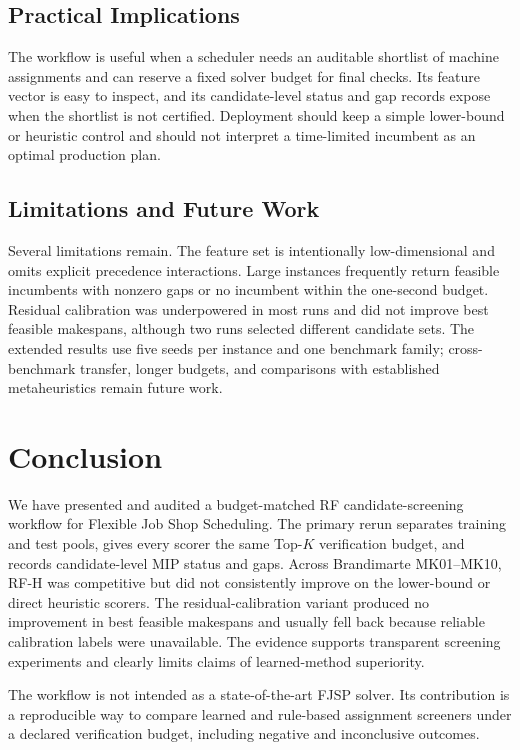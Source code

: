 \documentclass[12pt]{article}
\begin{document}
\subsection{Practical Implications}
The workflow is useful when a scheduler needs an auditable shortlist of machine assignments and can reserve a fixed solver budget for final checks. Its feature vector is easy to inspect, and its candidate-level status and gap records expose when the shortlist is not certified. Deployment should keep a simple lower-bound or heuristic control and should not interpret a time-limited incumbent as an optimal production plan.

\subsection{Limitations and Future Work}
Several limitations remain. The feature set is intentionally low-dimensional and omits explicit precedence interactions. Large instances frequently return feasible incumbents with nonzero gaps or no incumbent within the one-second budget. Residual calibration was underpowered in most runs and did not improve best feasible makespans, although two runs selected different candidate sets. The extended results use five seeds per instance and one benchmark family; cross-benchmark transfer, longer budgets, and comparisons with established metaheuristics remain future work.

\section{Conclusion}

We have presented and audited a budget-matched RF candidate-screening workflow for Flexible Job Shop Scheduling. The primary rerun separates training and test pools, gives every scorer the same Top-$K$ verification budget, and records candidate-level MIP status and gaps. Across Brandimarte MK01--MK10, RF-H was competitive but did not consistently improve on the lower-bound or direct heuristic scorers. The residual-calibration variant produced no improvement in best feasible makespans and usually fell back because reliable calibration labels were unavailable. The evidence supports transparent screening experiments and clearly limits claims of learned-method superiority.

The workflow is not intended as a state-of-the-art FJSP solver. Its contribution is a reproducible way to compare learned and rule-based assignment screeners under a declared verification budget, including negative and inconclusive outcomes.
\end{document}
